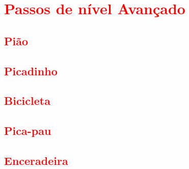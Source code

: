 

\chapter{\textcolor{red}{Passos de nível Avançado}}

\section{\textcolor{red}{Pião}}
\section{\textcolor{red}{Picadinho}}
\section{\textcolor{red}{Bicicleta}}
\section{\textcolor{red}{Pica-pau}}
\section{\textcolor{red}{Enceradeira}}


